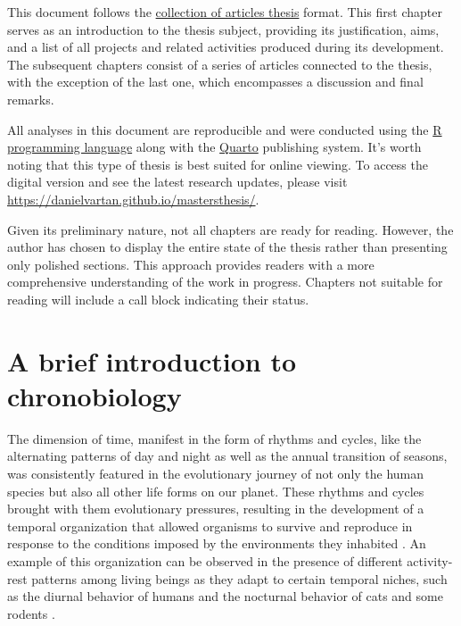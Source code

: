 \documentclass[
12pt,
openright,
oneside,
a4paper,
chapter=TITLE,
section=TITLE,
french,
spanish,
brazil,
english
]{abntex2}\usepackage{array}
\begin{document}
This document follows the
\href{https://en.wikipedia.org/wiki/Collection_of_articles}{collection
of articles thesis} format. This first chapter serves as an introduction
to the thesis subject, providing its justification, aims, and a list of
all projects and related activities produced during its development. The
subsequent chapters consist of a series of articles connected to the
thesis, with the exception of the last one, which encompasses a
discussion and final remarks.

All analyses in this document are reproducible and were conducted using
the \href{https://www.r-project.org/}{R programming language} along with
the \href{https://quarto.org/}{Quarto} publishing system. It's worth
noting that this type of thesis is best suited for online viewing. To
access the digital version and see the latest research updates, please
visit \url{https://danielvartan.github.io/mastersthesis/}.

Given its preliminary nature, not all chapters are ready for reading.
However, the author has chosen to display the entire state of the thesis
rather than presenting only polished sections. This approach provides
readers with a more comprehensive understanding of the work in progress.
Chapters not suitable for reading will include a call block indicating
their status.

\section{A brief introduction to
chronobiology}\label{a-brief-introduction-to-chronobiology}

The dimension of time, manifest in the form of rhythms and cycles, like
the alternating patterns of day and night as well as the annual
transition of seasons, was consistently featured in the evolutionary
journey of not only the human species but also all other life forms on
our planet. These rhythms and cycles brought with them evolutionary
pressures, resulting in the development of a temporal organization that
allowed organisms to survive and reproduce in response to the conditions
imposed by the environments they inhabited
\autocite{pittendrigh1981,menna-barreto2003}. An example of this
organization can be observed in the presence of different activity-rest
patterns among living beings as they adapt to certain temporal niches,
such as the diurnal behavior of humans and the nocturnal behavior of
cats and some rodents \autocite{foster2005}.
\end{document}
